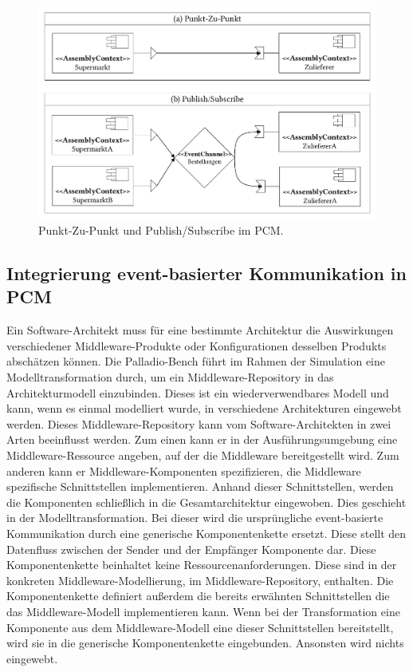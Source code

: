 \begin{figure}
\center
  \includegraphics[width=1\textwidth]{images/grundlagen/grundlagenEventSystem.pdf}
  \caption{Punkt-Zu-Punkt und Publish/Subscribe im PCM.}
  \label{img:grundlageneventssystem}
\end{figure}



\subsection{Integrierung event-basierter Kommunikation in PCM}
\label{sec:eventbasetransformation}
Ein Software-Architekt muss für eine bestimmte Architektur die Auswirkungen verschiedener Middleware-Produkte oder Konfigurationen desselben Produkts abschätzen können. Die Palladio-Bench führt im Rahmen der Simulation eine Modelltransformation durch, um ein Middleware-Repository in das Architekturmodell einzubinden. Dieses ist ein wiederverwendbares Modell und kann, wenn es einmal modelliert wurde, in verschiedene Architekturen eingewebt werden. Dieses Middleware-Repository kann vom Software-Architekten in zwei Arten beeinflusst werden. Zum einen kann er in der Ausführungsumgebung eine Middleware-Ressource angeben, auf der die Middleware bereitgestellt wird. Zum anderen kann er Middleware-Komponen\-ten spezifizieren, die Middleware spezifische Schnittstellen implementieren. Anhand dieser Schnittstellen, werden die Komponenten schließlich in die Gesamtarchitektur eingewoben. Dies geschieht in der Modelltransformation. Bei dieser wird die ursprüngliche event-basierte Kommunikation durch eine generische Komponentenkette ersetzt. Diese stellt den Datenfluss zwischen der Sender und der Empfänger Komponente dar. Diese Komponentenkette beinhaltet keine Ressourcenanforderungen. Diese sind in der konkreten Middleware-Modellierung, im Middleware-Repository, enthalten. Die Komponentenkette definiert außerdem die bereits erwähnten Schnittstellen die das Middleware-Modell implementieren kann. Wenn bei der Transformation eine Komponente aus dem Middleware-Modell eine dieser Schnittstellen bereitstellt, wird sie in die generische Komponentenkette eingebunden. Ansonsten wird nichts eingewebt.


